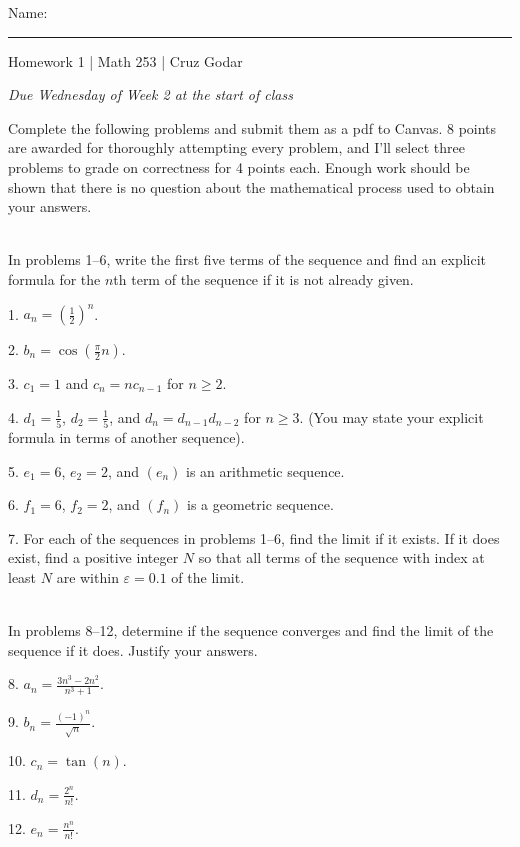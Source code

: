 \documentclass{article}
\begin{document}
\Large Name: \rule{2in}{0.15mm} \hfill Homework 1 | Math 253 | Cruz Godar \vspace{4pt} \normalsize

\textit{Due Wednesday of Week 2 at the start of class}

Complete the following problems and submit them as a pdf to Canvas. 8 points are awarded for thoroughly attempting every problem, and I'll select three problems to grade on correctness for 4 points each. Enough work should be shown that there is no question about the mathematical process used to obtain your answers. 

~\\

In problems 1--6, write the first five terms of the sequence and find an explicit formula for the $n$th term of the sequence if it is not already given.

1. $\displaystyle a_n = \left( \frac{1}{2} \right)^n$.

2. $\displaystyle b_n = \cos\left( \frac{\pi}{2} n \right)$.

3. $\displaystyle c_1 = 1$ and $\displaystyle c_n = nc_{n - 1}$ for $n \geq 2$.

4. $\displaystyle d_1 = \frac{1}{5}$, $\displaystyle d_2 = \frac{1}{5}$, and $d_n = d_{n - 1}d_{n - 2}$ for $n \geq 3$. (You may state your explicit formula in terms of another sequence).

5. $e_1 = 6$, $e_2 = 2$, and $(e_n)$ is an arithmetic sequence.

6. $f_1 = 6$, $f_2 = 2$, and $(f_n)$ is a geometric sequence.

7. For each of the sequences in problems 1--6, find the limit if it exists. If it does exist, find a positive integer $N$ so that all terms of the sequence with index at least $N$ are within $\varepsilon = 0.1$ of the limit.

~\\

In problems 8--12, determine if the sequence converges and find the limit of the sequence if it does. Justify your answers.

8. $\displaystyle a_n = \frac{3n^3 - 2n^2}{n^3 + 1}$.

9. $\displaystyle b_n = \frac{(-1)^n}{\sqrt{n}}$.

10. $\displaystyle c_n = \tan(n)$.

11. $\displaystyle d_n = \frac{2^n}{n!}$.

12. $\displaystyle e_n = \frac{n^n}{n!}$.
\end{document}
